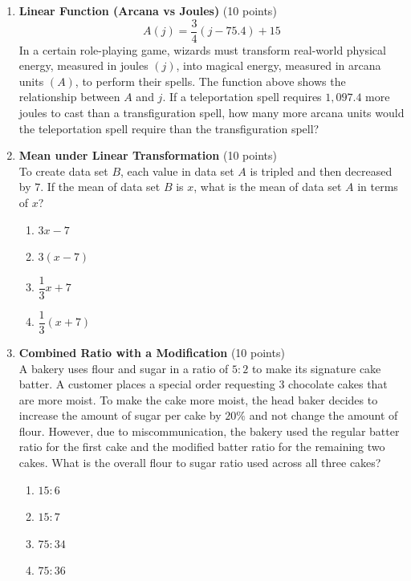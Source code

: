 \begin{enumerate}
  Given that a randomly selected student is in sixth grade, what is the probability that the student is left-handed?
  \begin{subanswer}
  \end{subanswer}

  \item \textbf{Linear Function (Arcana vs Joules)} (10 points)\\
  \[
  A(j)=\frac{3}{4}(j-75.4)+15
  \]
  In a certain role-playing game, wizards must transform real-world physical energy, measured in joules $(j)$, into magical energy, measured in arcana units $(A)$, to perform their spells. The function above shows the relationship between $A$ and $j$. If a teleportation spell requires $1{,}097.4$ more joules to cast than a transfiguration spell, how many more arcana units would the teleportation spell require than the transfiguration spell?
  \begin{subanswer}
  \end{subanswer}



  \newpage

  \item \textbf{Mean under Linear Transformation} (10 points)\\
  To create data set $B$, each value in data set $A$ is tripled and then decreased by $7$. If the mean of data set $B$ is $x$, what is the mean of data set $A$ in terms of $x$?
  \begin{enumerate}[label=(\Alph*)]
    \item $3x-7$
    \item $3(x-7)$
    \item $\dfrac{1}{3}x+7$
    \item $\dfrac{1}{3}(x+7)$
  \end{enumerate}
  \begin{subanswer}
  \end{subanswer}

  \item \textbf{Combined Ratio with a Modification} (10 points)\\
  A bakery uses flour and sugar in a ratio of $5:2$ to make its signature cake batter. A customer places a special order requesting 3 chocolate cakes that are more moist. To make the cake more moist, the head baker decides to increase the amount of sugar per cake by $20\%$ and not change the amount of flour. However, due to miscommunication, the bakery used the regular batter ratio for the first cake and the modified batter ratio for the remaining two cakes. What is the overall flour to sugar ratio used across all three cakes?
  \begin{enumerate}[label=(\Alph*)]
    \item $15:6$
    \item $15:7$
    \item $75:34$
    \item $75:36$
  \end{enumerate}
  \begin{subanswer}
  \end{subanswer}


\end{enumerate}
